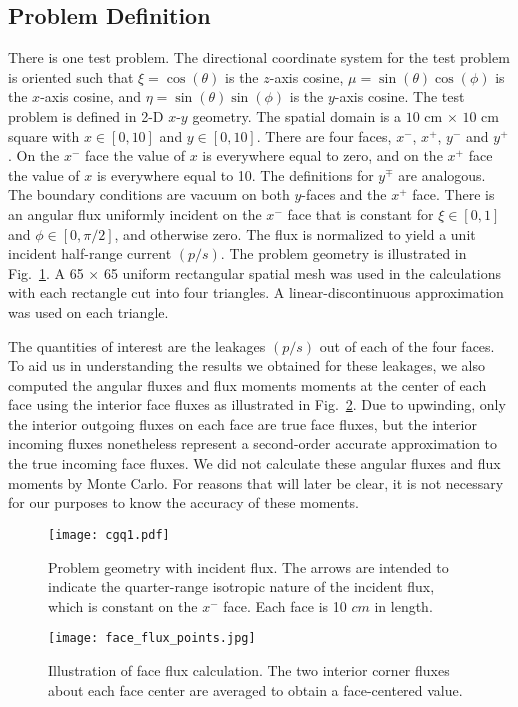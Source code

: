 \documentclass[12pt]{article}
\newcommand{\LFI}[1]{\label{fi:#1}}
\newcommand{\FI}[1]{Fig.~\ref{fi:#1}}
\begin{document}
\begin{center}
\subsection{Problem Definition}
There is one test problem. The directional coordinate system for the test problem 
is oriented such that $\xi=\cos(\theta)$ is the $z$-axis cosine, 
$\mu=\sin(\theta)\cos(\phi)$ is the $x$-axis cosine, and $\eta=\sin(\theta)\sin(\phi)$ is the $y$-axis cosine.  
The test  problem is defined in 2-D $x$-$y$ geometry.  The spatial domain 
is a $10$ cm $\times$ $10$ cm square with $x\in [0, 10]$ and $y\in [0, 10]$. There are four faces, $x^{-}$, $x^{+}$, 
$y^{-}$ and $y^{+}$.  On the $x^{-}$ face the value of $x$ is everywhere equal to zero, and on the $x^{+}$ face the 
value of $x$ is everywhere equal to 10.  The definitions for $y^{\mp}$ are analogous.  
The boundary conditions are vacuum on both $y$-faces and the $x^{+}$ face.  
There is an angular flux uniformly incident on the $x^{-}$ face that is constant for $\xi\in[0,1]$ and 
$\phi \in [0,\pi/2]$, and otherwise zero.  The flux is normalized to yield a unit incident half-range current 
$(p/s)$.  The problem geometry is illustrated in \FI{1}.  A 65 $\times$ 65 uniform rectangular spatial mesh was used in the 
calculations with each rectangle cut into four triangles.  A linear-discontinuous approximation was used on each triangle.
 
The quantities of interest are the leakages $(p/s)$ out of each of the four faces.  To aid us in understanding the results we 
obtained for these leakages, we also computed the angular fluxes and flux moments moments at the center of each face using the interior 
face fluxes as illustrated in \FI{2}.  Due to upwinding, only the interior outgoing fluxes on each face are true face fluxes, but the 
interior incoming fluxes nonetheless represent a second-order accurate approximation to the true incoming face fluxes.  We did not 
calculate these angular fluxes and flux moments by Monte Carlo.  For reasons that will later be clear, it is not necessary for our 
purposes to know the accuracy of these moments.
\begin{figure}[htb]
\begin{center}
\texttt{[image: cgq1.pdf]}
\caption{Problem geometry with incident flux. The arrows are intended to indicate the quarter-range isotropic nature of the incident flux, 
which is constant on the $x^{-}$ face. Each face is 10 $cm$ in length.}
\LFI{1}
\end{center}
\end{figure}
\begin{figure}[htb]
\begin{center}
\texttt{[image: face\_flux\_points.jpg]}
\caption{Illustration of face flux calculation.  The two interior corner fluxes about each face center are averaged to obtain a face-centered value.}
\LFI{2}
\end{center}
\end{figure}


\end{center}
\end{document}
